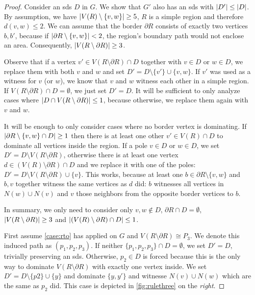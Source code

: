 \begin{proof}
        Consider an sds $D$ in $G$. We show that $G'$ also has an sds with $\abs{D'} \leq \abs{D}$. 
        By assumption, we have $\abs{V(R) \setminus \{v, w\}} \geq 5$, $R$ is a simple region and therefore $d(v,w) \leq 2$.
        We can assume that the border $\partial R$ consists of exactly two vertices $b, b'$, because if $\abs{\partial R \setminus \{v,w\}}  < 2$, the region's boundary path would not enclose an area.
        Consequently, $\abs{V(R \setminus \partial R)} \geq 3$.

        Observe that if a vertex $v' \in V(R \setminus \partial R) \cap D$ together with $v \in D$ or $w\in D$, we replace them with both $v$ and $w$ and set $D' = D \setminus \{v'\} \cup \{v,w\}$.  
        If $v'$ was used as a witness for $v$ (or $w$), we know that $v$ and $w$ witness each other in a simple region. 
        If $V(R \setminus \partial R) \cap D = \emptyset$, we just set $D' = D$. 
        It will be sufficient to only analyze cases where $\abs{D \cap V(R \setminus \partial R)} \leq 1$, because otherwise, we replace them again with $v$ and $w$. 

        It will be enough to only consider cases where no border vertex is dominating. 
        If $\abs{\partial R \setminus \{v,w\} \cap D} \geq 1$ then there is at least one other $v' \in V(R) \cap D$ to dominate all vertices inside the region.
        If a pole $v \in D$ or $w \in D$, we set $D' = D \setminus V(R \setminus \partial R)$, otherwise there is at least one vertex $d \in (V(R) \setminus \partial R) \cap D$ and we replace it with one of the poles: $D' = D \setminus V(R \setminus \partial R) \cup \{v\}$.
        This works, because at least one $b \in \partial R \setminus \{v, w\}$ and $b,v$ together witness the same vertices as $d$ did: $b$ witnesses all vertices in $N(w) \cup N(v)$ and $v$ those neighbors from the opposite border vertices to $b$.

        \vspace*{1em}
        
        In summary, we only need to consider only $v,w \notin D$, $\partial R \cap D = \emptyset$, $\abs{V(R \setminus \partial R)} \geq 3$ and $\abs{(V(R) \setminus \partial R) \cap D} \leq 1$.

        First assume \cref{case:rto} has applied on $G$ and $V(R \setminus \partial R) \cong P_3$. 
        We denote this induced path as $(p_1,p_2,p_3)$.         
         If neither $\{p_1,p_2,p_3\} \cap D = \emptyset$, we set $D' = D$, trivially preserving an sds. 
         Otherwise, $p_2 \in D$ is forced because this is the only way to dominate $V(R \setminus \partial R)$ with exactly one vertex inside. 
         We set $D' = D \setminus \{p2\} \cup \{y\}$ and dominate $\{y,y'\}$ and witnesse $N(v) \cup N(w)$ which are the same as $p_2$ did. 
         This case is depicted in \cref{fig:rulethree} on the \textit{right}.


\end{proof}
